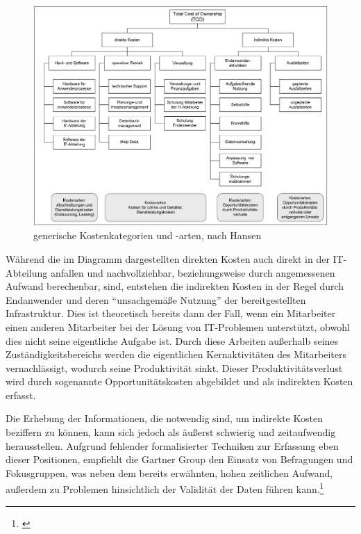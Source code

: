 \begin{figure}[h!]
	\centering
	\includegraphics[width=\textwidth]
	{kapitel/gruppe4_2/bilder/generische_kostenkategorien}
	\caption{generische Kostenkategorien und -arten, nach Hansen}
	\label{fig_generische_kostenarten}
\end{figure}

Während die im Diagramm dargestellten direkten Kosten auch direkt in der IT-Abteilung anfallen und nachvollziehbar, beziehungsweise durch angemessenen Aufwand berechenbar, sind, entstehen die indirekten Kosten in der Regel durch Endanwender und deren “unsachgemäße Nutzung” der bereitgestellten Infrastruktur. Dies ist theoretisch bereits dann der Fall, wenn ein Mitarbeiter einen anderen Mitarbeiter bei der Lösung von IT-Problemen unterstützt, obwohl dies nicht seine eigentliche Aufgabe ist. Durch diese Arbeiten außerhalb seines Zuständigkeitsbereichs werden die eigentlichen Kernaktivitäten des Mitarbeiters vernachlässigt, wodurch seine Produktivität sinkt. Dieser Produktivitätsverlust wird durch sogenannte Opportunitätskosten abgebildet und als indirekten Kosten erfasst.

Die Erhebung der Informationen, die notwendig sind, um indirekte Kosten beziffern zu können, kann sich jedoch als äußerst schwierig und zeitaufwendig herausstellen. Aufgrund fehlender formalisierter Techniken zur Erfassung eben dieser Positionen, empfiehlt die Gartner Group den Einsatz von Befragungen und Fokusgruppen, was neben dem bereits erwähnten, hohen zeitlichen Aufwand, außerdem zu Problemen hinsichtlich der Validität der Daten führen kann.\footnote{\cite{hansen_business_2009}}

